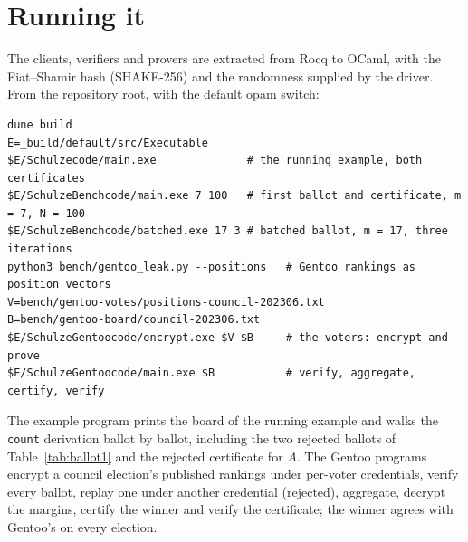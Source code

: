 \documentclass[11pt,a4paper]{article}
\newcommand{\rocq}[1]{\texttt{#1}}
\theoremstyle{remark}
\begin{document}
\section{Running it}\label{sec:artefact}
The clients, verifiers and provers are extracted from Rocq to OCaml, with
the Fiat--Shamir hash (SHAKE-256) and the randomness supplied by the
driver. From the repository root, with the default opam switch:
{\small
\begin{verbatim}
dune build
E=_build/default/src/Executable
$E/Schulzecode/main.exe              # the running example, both certificates
$E/SchulzeBenchcode/main.exe 7 100   # first ballot and certificate, m = 7, N = 100
$E/SchulzeBenchcode/batched.exe 17 3 # batched ballot, m = 17, three iterations
python3 bench/gentoo_leak.py --positions   # Gentoo rankings as position vectors
V=bench/gentoo-votes/positions-council-202306.txt
B=bench/gentoo-board/council-202306.txt
$E/SchulzeGentoocode/encrypt.exe $V $B     # the voters: encrypt and prove
$E/SchulzeGentoocode/main.exe $B           # verify, aggregate, certify, verify
\end{verbatim}}
The example program prints the board of the running example and walks the
\rocq{count} derivation ballot by ballot, including the two rejected
ballots of Table~\ref{tab:ballot1} and the rejected certificate for $A$.
The Gentoo programs encrypt a council election's published rankings under
per-voter credentials, verify every ballot, replay one under another
credential (rejected), aggregate, decrypt the margins, certify the winner
and verify the certificate; the winner agrees with Gentoo's on every
election.
\end{document}
